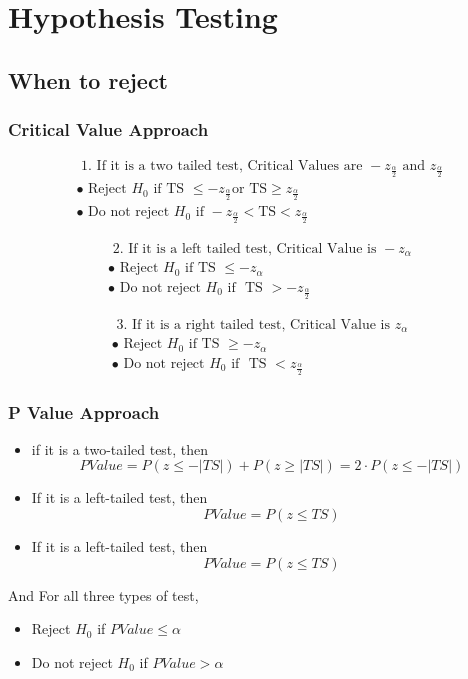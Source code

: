 \documentclass{article}
\begin{document}
\section{Hypothesis Testing}
\subsection{When to reject}
\subsubsection{Critical Value Approach}
\begin{align*}
    \text { 1. If it is a two tailed test, Critical Values are } -z_{\frac{\alpha}{2}} \text{ and } z_{\frac{\alpha}{2}} \\
    \bullet \text { Reject } H_{0} \text{ if TS } \leq -z_{\frac{\alpha}{2}} \text{or TS} \geq z_{\frac{\alpha}{2}} \\
    \bullet \text { Do not reject } H_{0} \text{ if } -z_{\frac{\alpha}{2}} < \text{TS} < z_{\frac{\alpha}{2}} 
\end{align*}

\begin{align*}
    \text { 2. If it is a left tailed test, Critical Value is } -z_{\alpha} \\
    \bullet \text { Reject } H_{0} \text{ if TS } \leq -z_{\alpha} \\
    \bullet \text { Do not reject } H_{0} \text{ if }  \text{ TS } > -z_{\frac{\alpha}{2}}
\end{align*}

\begin{align*}
    \text { 3. If it is a right tailed test, Critical Value is } z_{\alpha} \\
    \bullet \text { Reject } H_{0} \text{ if TS } \geq -z_{\alpha} \\
    \bullet \text { Do not reject } H_{0} \text{ if }  \text{ TS } < z_{\frac{\alpha}{2}}
\end{align*}

\subsubsection{P Value Approach}
\begin{itemize}
    \item if it is a two-tailed test, then \[ P Value = P(z \leq - |TS|) + P(z \geq |TS|) = 2 \cdot P(z \leq -|TS|) \]
    \item If it is a left-tailed test, then \[ P Value = P(z \leq TS) \]  
    \item If it is a left-tailed test, then \[ P Value = P(z \leq TS) \]
\end{itemize}
And For all three types of test, 
\begin{itemize}
    \item Reject $ H_{0} $ if $ PValue \leq \alpha $
    \item Do not reject $ H_{0} $ if $ PValue > \alpha $
\end{itemize}
\end{document}
